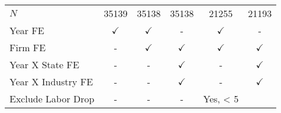\begin{table}[htbp]
\begin{tabular}{l*{5}{c}}
\midrule
\(N\)       &       35139         &       35138         &       35138         &       21255         &       21193         \\
Year FE     &$\checkmark$         &$\checkmark$         &           -         &$\checkmark$         &           -         \\
Firm FE     &           -         &$\checkmark$         &$\checkmark$         &$\checkmark$         &$\checkmark$         \\
Year X State FE&           -         &           -         &$\checkmark$         &           -         &$\checkmark$         \\
Year X Industry FE&           -         &           -         &$\checkmark$         &           -         &$\checkmark$         \\
Exclude Labor Drop&           -         &           -         &           -         &   Yes, < 5%
\bottomrule
\end{tabular}
\end{table}
